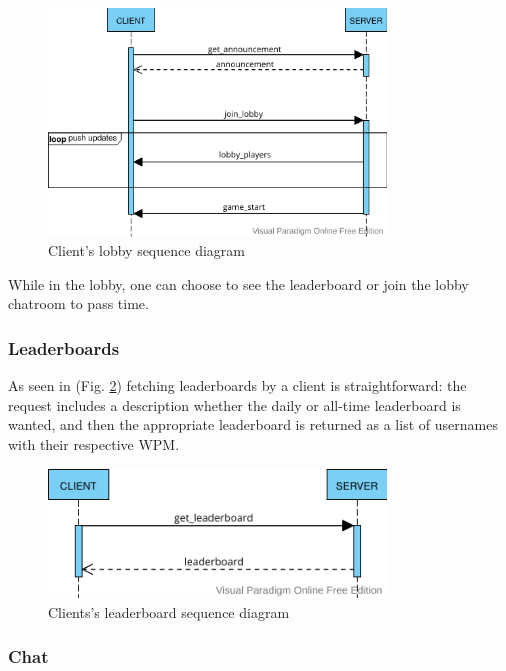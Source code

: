 \documentclass[titlepage]{article}
\newcommand{\figref}[1]{{(Fig. \hypersetup{linkcolor=blue}\ref{#1})}}
\begin{document}
\begin{figure}[H]
	\centering
	\includegraphics[width=0.8\textwidth]{seq_diagram_lobby_players.png}
	\caption{Client's lobby sequence diagram}
	\label{fig:seq-client-lobby}
\end{figure}

While in the lobby, one can choose to see the leaderboard or join the lobby chatroom to pass time.

\subsubsection{Leaderboards}

As seen in \figref{fig:seq-client-leaderboard} fetching leaderboards by a client is straightforward: the request includes a description whether the daily or all-time leaderboard is wanted, and then the appropriate leaderboard is returned as a list of usernames with their respective WPM.

\begin{figure}[H]
	\centering
	\includegraphics[width=0.8\textwidth]{seq_diagram_leaderboard.png}
	\caption{Clients's leaderboard sequence diagram}
	\label{fig:seq-client-leaderboard}
\end{figure}

\subsubsection{Chat}
\end{document}
